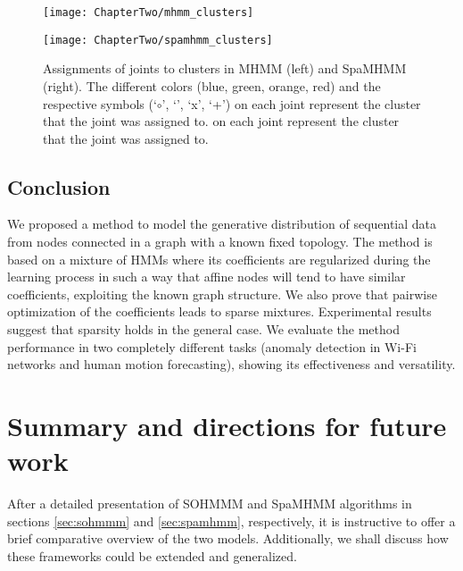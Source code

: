 \begin{figure*}
    \centering
    \begin{minipage}{.5\textwidth}
        \centering
        \texttt{[image: ChapterTwo/mhmm\_clusters]}
    \end{minipage}%
    \begin{minipage}{.5\textwidth}
        \centering
        \texttt{[image: ChapterTwo/spamhmm\_clusters]}
    \end{minipage}
    \caption{Assignments of joints to clusters in MHMM (left) and SpaMHMM (right). The different colors (blue, green, orange, red) and the respective symbols (`$\circ$', `\SmallTriangleUp', `x', `+') on each joint represent the cluster that the joint was assigned to. on each joint represent the cluster that the joint was assigned to.}
    \label{fig:clusters}
\end{figure*}

\subsection{Conclusion}
We proposed a method to model the generative distribution of sequential data from nodes connected in a graph with a known fixed topology. The method is based on a mixture of HMMs where its coefficients are regularized during the learning process in such a way that affine nodes will tend to have similar coefficients, exploiting the known graph structure. We also prove that pairwise optimization of the coefficients leads to sparse mixtures. Experimental results suggest that sparsity holds in the general case. We evaluate the method performance in two completely different tasks (anomaly detection in Wi-Fi networks and human motion forecasting), showing its effectiveness and versatility.

\section{Summary and directions for future work}
\label{sec:summary}
After a detailed presentation of SOHMMM and SpaMHMM algorithms in sections \ref{sec:sohmmm} and \ref{sec:spamhmm}, respectively, it is instructive to offer a brief comparative overview of the two models. Additionally, we shall discuss how these frameworks could be extended and generalized.

